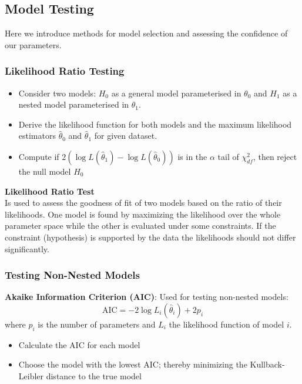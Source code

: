 \documentclass{article}
\begin{document}
\begin{multicols*}{3}
\subsection{Model Testing}

Here we introduce methods for model selection and assessing the confidence of our parameters. 

\subsubsection{Likelihood Ratio Testing}

\begin{itemize}
    \item Consider two models: $H_0$ as a general model parameterised in $\theta_0$ and $H_1$ as a nested model parameterised in $\theta_1$.
    \item Derive the likelihood function for both models and the maximum likelihood estimators $\hat{\theta}_0$ and $\hat{\theta}_1$ for given dataset. 
    \item Compute if $2(\log L (\hat{\theta}_1) - \log L(\hat{\theta}_0))$ is in the $\alpha$ tail of $\chi_{df}^2$, then reject the null model $H_0$   
\end{itemize}

\begin{mdframed}[backgroundcolor=astral] 
    \textbf{Likelihood Ratio Test}\\
    Is used to assess the goodness of fit of two models based on the ratio of their likelihoods. One model is found by maximizing the likelihood over the whole parameter space while the other is evaluated under some constraints. If the constraint (hypothesis) is supported by the data the likelihoods should not differ significantly.
\end{mdframed}

\subsubsection{Testing Non-Nested Models}

\textbf{Akaike Information Criterion (AIC)}: Used for testing non-nested models:
$$\text{AIC} = -2\log L_i(\hat{\theta}_i) + 2p_i$$
where $p_i$ is the number of parameters and $L_i$ the likelihood function of model $i$.

\begin{itemize}
    \item Calculate the AIC for each model
    \item Choose the model with the lowest AIC; thereby minimizing the Kullback-Leibler distance to the true model  
\end{itemize}


\end{multicols*}
\end{document}

